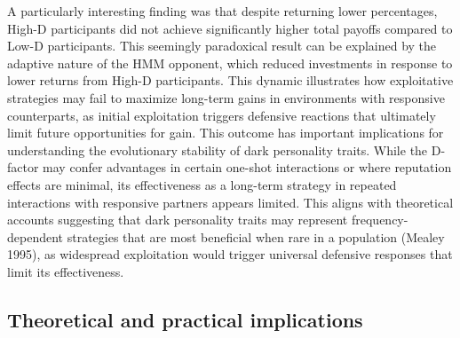 \documentclass[
]{article}
\begin{document}
A particularly interesting finding was that despite returning lower percentages, High-D participants did not achieve significantly higher total payoffs compared to Low-D participants.
This seemingly paradoxical result can be explained by the adaptive nature of the HMM opponent, which reduced investments in response to lower returns from High-D participants.
This dynamic illustrates how exploitative strategies may fail to maximize long-term gains in environments with responsive counterparts, as initial exploitation triggers defensive reactions that ultimately limit future opportunities for gain.
This outcome has important implications for understanding the evolutionary stability of dark personality traits.
While the D-factor may confer advantages in certain one-shot interactions or where reputation effects are minimal, its effectiveness as a long-term strategy in repeated interactions with responsive partners appears limited.
This aligns with theoretical accounts suggesting that dark personality traits may represent frequency-dependent strategies that are most beneficial when rare in a population (Mealey 1995), as widespread exploitation would trigger universal defensive responses that limit its effectiveness.

\subsection{Theoretical and practical implications}\label{theoretical-and-practical-implications}
\end{document}
